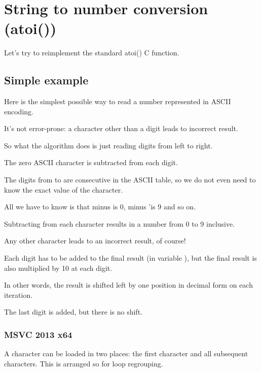 \section{String to number conversion (atoi())}


Let's try to reimplement the standard atoi() C function.

\subsection{Simple example}

Here is the simplest possible way to read a number represented in \ac{ASCII} encoding.

It's not error-prone: a character other than a digit leads to incorrect result.



So what the algorithm does is just reading digits from left to right.

The zero \ac{ASCII} character is subtracted from each digit. 

The digits from  to  are consecutive in the \ac{ASCII} table, so 
we do not even need to know the exact value of the  character.

All we have to know is that  minus  is 0,  minus 'is 9 and so on.

Subtracting  from each character results in a number from 0 to 9 inclusive.

Any other character leads to an incorrect result, of course!

Each digit has to be added to the final result (in variable ), but the final result
is also multiplied by 10 at each digit.

In other words, the result is shifted left by one position in decimal form on each iteration.

The last digit is added, but there is no shift.

\subsubsection{\Optimizing MSVC 2013 x64}



A character can be loaded in two places: the first character and all subsequent characters.
This is arranged so for loop regrouping.

